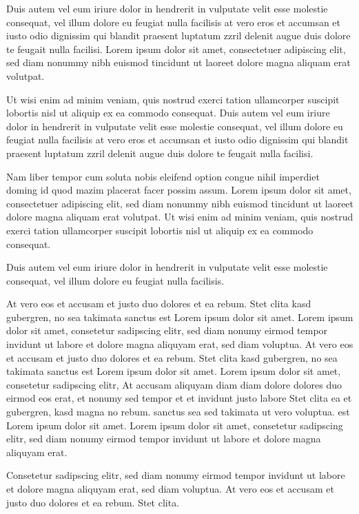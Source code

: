 \documentclass[]{../metanetpaper}
\begin{document}
\begin{Parallel}[c]{80mm}{80mm}
{    Duis autem vel eum iriure dolor in hendrerit in vulputate velit esse molestie consequat, vel illum dolore eu feugiat nulla facilisis at vero eros et accumsan et iusto odio dignissim qui blandit praesent luptatum zzril delenit augue duis dolore te feugait nulla facilisi. Lorem ipsum dolor sit amet, consectetuer adipiscing elit, sed diam nonummy nibh euismod tincidunt ut laoreet dolore magna aliquam erat volutpat.   

    Ut wisi enim ad minim veniam, quis nostrud exerci tation ullamcorper suscipit lobortis nisl ut aliquip ex ea commodo consequat. Duis autem vel eum iriure dolor in hendrerit in vulputate velit esse molestie consequat, vel illum dolore eu feugiat nulla facilisis at vero eros et accumsan et iusto odio dignissim qui blandit praesent luptatum zzril delenit augue duis dolore te feugait nulla facilisi.   

    Nam liber tempor cum soluta nobis eleifend option congue nihil imperdiet doming id quod mazim placerat facer possim assum. Lorem ipsum dolor sit amet, consectetuer adipiscing elit, sed diam nonummy nibh euismod tincidunt ut laoreet dolore magna aliquam erat volutpat. Ut wisi enim ad minim veniam, quis nostrud exerci tation ullamcorper suscipit lobortis nisl ut aliquip ex ea commodo consequat.   

    Duis autem vel eum iriure dolor in hendrerit in vulputate velit esse molestie consequat, vel illum dolore eu feugiat nulla facilisis.   

    At vero eos et accusam et justo duo dolores et ea rebum. Stet clita kasd gubergren, no sea takimata sanctus est Lorem ipsum dolor sit amet. Lorem ipsum dolor sit amet, consetetur sadipscing elitr, sed diam nonumy eirmod tempor invidunt ut labore et dolore magna aliquyam erat, sed diam voluptua. At vero eos et accusam et justo duo dolores et ea rebum. Stet clita kasd gubergren, no sea takimata sanctus est Lorem ipsum dolor sit amet. Lorem ipsum dolor sit amet, consetetur sadipscing elitr, At accusam aliquyam diam diam dolore dolores duo eirmod eos erat, et nonumy sed tempor et et invidunt justo labore Stet clita ea et gubergren, kasd magna no rebum. sanctus sea sed takimata ut vero voluptua. est Lorem ipsum dolor sit amet. Lorem ipsum dolor sit amet, consetetur sadipscing elitr, sed diam nonumy eirmod tempor invidunt ut labore et dolore magna aliquyam erat.   

    Consetetur sadipscing elitr, sed diam nonumy eirmod tempor invidunt ut labore et dolore magna aliquyam erat, sed diam voluptua. At vero eos et accusam et justo duo dolores et ea rebum. Stet clita.
  }


\end{Parallel}
\end{document}
